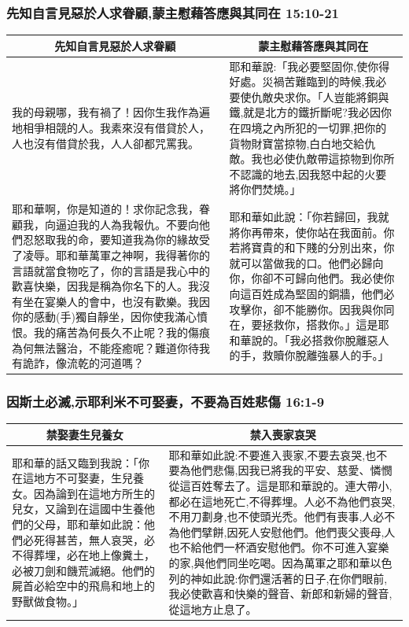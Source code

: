 \subsubsection{先知自言見惡於人求眷顧,蒙主慰藉答應與其同在 15:10-21}
\begin{table}[H]
\centering
\begin{tabular}{p{8.5cm}|p{8.750cm}}\hline\hline
\multicolumn{1}{c|}{先知自言見惡於人求眷顧}&\multicolumn{1}{c}{蒙主慰藉答應與其同在}\\\hline
我的母親哪，我有禍了！因你生我作為遍地相爭相競的人。我素來沒有借貸於人，人也沒有借貸於我，人人卻都咒罵我。 
&耶和華說:「我必要堅固你,使你得好處。災禍苦難臨到的時候,我必要使仇敵央求你。「人豈能將銅與鐵,就是北方的鐵折斷呢?我必因你在四境之內所犯的一切罪,把你的貨物財寶當掠物,白白地交給仇敵。我也必使仇敵帶這掠物到你所不認識的地去,因我怒中起的火要將你們焚燒。」\\\hline
耶和華啊，你是知道的！求你記念我，眷顧我，向逼迫我的人為我報仇。不要向他們忍怒取我的命，要知道我為你的緣故受了凌辱。耶和華萬軍之神啊，我得著你的言語就當食物吃了，你的言語是我心中的歡喜快樂，因我是稱為你名下的人。我沒有坐在宴樂人的會中，也沒有歡樂。我因你的感動(手)獨自靜坐，因你使我滿心憤恨。我的痛苦為何長久不止呢？我的傷痕為何無法醫治，不能痊癒呢？難道你待我有詭詐，像流乾的河道嗎？
&耶和華如此說：「你若歸回，我就將你再帶來，使你站在我面前。你若將寶貴的和下賤的分別出來，你就可以當做我的口。他們必歸向你，你卻不可歸向他們。我必使你向這百姓成為堅固的銅牆，他們必攻擊你，卻不能勝你。因我與你同在，要拯救你，搭救你。」這是耶和華說的。「我必搭救你脫離惡人的手，救贖你脫離強暴人的手。」\\\hline
\end{tabular}
\end{table}



\subsubsection{因斯土必滅,示耶利米不可娶妻，不要為百姓悲傷 16:1-9}
\begin{table}[H]
\centering
\begin{tabular}{p{6.2cm}|p{}}\hline\hline
\multicolumn{1}{c|}{禁娶妻生兒養女}&\multicolumn{1}{c}{禁入喪家哀哭}\\\hline
耶和華的話又臨到我說：「你在這地方不可娶妻，生兒養女。因為論到在這地方所生的兒女，又論到在這國中生養他們的父母，耶和華如此說：他們必死得甚苦，無人哀哭，必不得葬埋，必在地上像糞土，必被刀劍和饑荒滅絕。他們的屍首必給空中的飛鳥和地上的野獸做食物。」
&耶和華如此說:不要進入喪家,不要去哀哭,也不要為他們悲傷,因我已將我的平安、慈愛、憐憫從這百姓奪去了。這是耶和華說的。連大帶小,都必在這地死亡,不得葬埋。人必不為他們哀哭,不用刀劃身,也不使頭光禿。他們有喪事,人必不為他們擘餅,因死人安慰他們。他們喪父喪母,人也不給他們一杯酒安慰他們。你不可進入宴樂的家,與他們同坐吃喝。因為萬軍之耶和華以色列的神如此說:你們還活著的日子,在你們眼前,我必使歡喜和快樂的聲音、新郎和新婦的聲音,從這地方止息了。\\\hline
\end{tabular}
\end{table}




